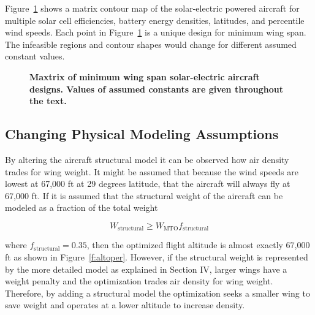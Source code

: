 Figure~\ref{f:solarcontours} shows a matrix contour map of the solar-electric powered aircraft for multiple solar cell efficiencies, battery energy densities, latitudes, and percentile wind speeds.
Each point in Figure~\ref{f:solarcontours} is a unique design for minimum wing span. 
The infeasible regions and contour shapes would change for different assumed constant values. 

 \begin{figure}[H]
 \begin{subfigmatrix}{3}%
 \end{subfigmatrix}
 \caption{\textbf{Maxtrix of minimum wing span solar-electric aircraft designs. Values of assumed constants are given throughout the text.}}
 \label{f:solarcontours}
\end{figure}

\subsection{Changing Physical Modeling Assumptions}

By altering the aircraft structural model it can be observed how air density trades for wing weight. 
It might be assumed that because the wind speeds are lowest at 67,000 ft at 29 degrees latitude, that the aircraft will always fly at 67,000 ft.  
If it is assumed that the structural weight of the aircraft can be modeled as a fraction of the total weight 

\begin{equation}
    W_{\text{structural}} \geq W_{\text{MTO}} f_{\text{structural}}
\end{equation}

where $f_{\text{structural}} = 0.35$, then the optimized flight altitude is almost exactly 67,000 ft as shown in Figure~\ref{f:altoper}.  
However, if the structural weight is represented by the more detailed model as explained in Section IV, larger wings have a weight penalty and the optimization trades air density for wing weight.
Therefore, by adding a structural model the optimization seeks a smaller wing to save weight and operates at a lower altitude to increase density. 


